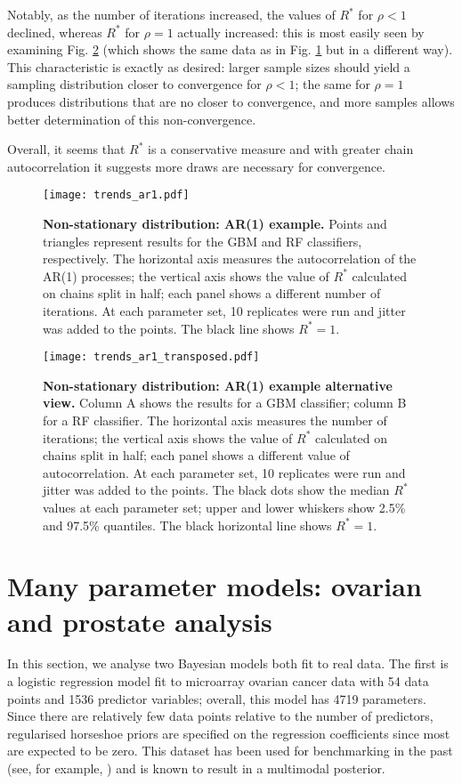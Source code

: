 \documentclass{article}
\begin{document}
Notably, as the number of iterations increased, the values of $R^*$ for $\rho<1$ declined, whereas $R^*$ for $\rho=1$ actually increased: this is most easily seen by examining Fig. \ref{fig:trends_ar1_transposed} (which shows the same data as in Fig. \ref{fig:trends_ar1} but in a different way). This characteristic is exactly as desired: larger sample sizes should yield a sampling distribution closer to convergence for $\rho<1$; the same for $\rho=1$ produces distributions that are no closer to convergence, and more samples allows better determination of this non-convergence.

Overall, it seems that $R^*$ is a conservative measure and with greater chain autocorrelation it suggests more draws are necessary for convergence.

\begin{figure}[!htb]
	\centerline{\texttt{[image: trends\_ar1.pdf]}}
	\caption{\textbf{Non-stationary distribution: AR(1) example.} Points and triangles represent results for the GBM and RF classifiers, respectively. The horizontal axis measures the autocorrelation of the AR(1) processes; the vertical axis shows the value of $R^*$ calculated on chains split in half; each panel shows a different number of iterations. At each parameter set, 10 replicates were run and jitter was added to the points. The black line shows $R^*=1$.}
	\label{fig:trends_ar1}
\end{figure}

\begin{figure}[!htb]
	\centerline{\texttt{[image: trends\_ar1\_transposed.pdf]}}
	\caption{\textbf{Non-stationary distribution: AR(1) example alternative view.} Column A shows the results for a GBM classifier; column B for a RF classifier. The horizontal axis measures the number of iterations; the vertical axis shows the value of $R^*$ calculated on chains split in half; each panel shows a different value of autocorrelation. At each parameter set, 10 replicates were run and jitter was added to the points. The black dots show the median $R^*$ values at each parameter set; upper and lower whiskers show 2.5\% and 97.5\% quantiles. The black horizontal line shows $R^*=1$. }
	\label{fig:trends_ar1_transposed}
\end{figure}

\section{Many parameter models: ovarian and prostate analysis}\label{sec:prostate}
In this section, we analyse two Bayesian models both fit to real data. The first is a logistic regression model fit to microarray ovarian cancer data with 54 data points and 1536 predictor variables; overall, this model has 4719 parameters. Since there are relatively few data points relative to the number of predictors, regularised horseshoe priors are specified on the regression coefficients \citep{piironen2017sparsity} since most are expected to be zero. This dataset has been used for benchmarking in the past (see, for example, \cite{schummer1999comparative,hernandez2010expectation,paananen2019implicitly}) and is known to result in a multimodal posterior.
\end{document}
